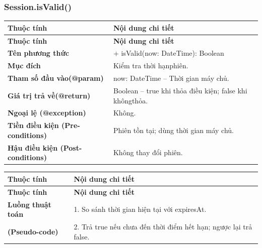 \subsubsection{Session.isValid()}
\begin{longtable}{|L{0.24\textwidth}|L{0.70\textwidth}|}
\hline
\textbf{Thuộc tính} & \textbf{Nội dung chi tiết} \\
\hline
\endfirsthead
\hline
\textbf{Thuộc tính} & \textbf{Nội dung chi tiết} \\
\hline
\endhead
\textbf{Tên phương thức} & + isValid(now: DateTime): Boolean \\
\hline
\textbf{Mục đích} & Kiểm tra thời hạnphiên. \\
\hline
\textbf{Tham số đầu vào}\newline \textbf{(@param)} & now: DateTime – Thời gian máy chủ. \\
\hline
\textbf{Giá trị trả về(@return)} & Boolean – true khi thỏa điều kiện; false khi khôngthỏa. \\
\hline
\textbf{Ngoại lệ (@exception)} & Không. \\
\hline
\textbf{Tiền điều kiện (Pre-}\newline \textbf{conditions)} & Phiên tồn tại; dùng thời gian máy chủ. \\
\hline
\textbf{Hậu điều kiện (Post-}\newline \textbf{conditions)} & Không thay đổi phiên. \\
\hline
\end{longtable}
\vspace{-0.5\baselineskip}
\begin{longtable}{|L{0.24\textwidth}|L{0.70\textwidth}|}
\hline
\textbf{Thuộc tính} & \textbf{Nội dung chi tiết} \\
\hline
\endfirsthead
\hline
\textbf{Thuộc tính} & \textbf{Nội dung chi tiết} \\
\hline
\endhead
\textbf{Luồng thuật toán} & 1. So sánh thời gian hiện tại với expiresAt. \\
\hline
\textbf{(Pseudo-code)} & 2. Trả true nếu chưa đến thời điểm hết hạn; ngược lại trả false. \\
\hline
\end{longtable}
\vspace{-0.5\baselineskip}
